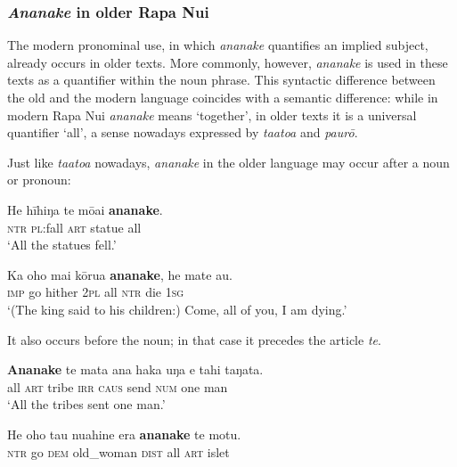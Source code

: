 \subsubsection{\textit{Ananake} in older Rapa Nui}\label{sec:4.4.4.2}

The modern pronominal use, in which \textit{ananake} quantifies an implied subject, already occurs in older texts. More commonly, however, \textit{ananake} is used in these texts as a quantifier within the noun phrase. This syntactic difference between the old and the modern language coincides with a semantic difference: while in modern Rapa Nui \textit{ananake} means ‘together’, in older texts it is a universal quantifier ‘all’, a sense nowadays expressed by \textit{ta{\ꞌ}ato{\ꞌ}a} and \textit{paurō}.

Just like \textit{ta{\ꞌ}ato{\ꞌ}a} nowadays, \textit{ananake} in the older language may occur after a noun or pronoun:

\ea\label{ex:4.66}
\gll He hīhiŋa te mōai \textbf{ananake}. \\
\textsc{ntr} \textsc{pl}:fall \textsc{art} statue all \\

\glt 
‘All the statues fell.’ \textstyleExampleref{[Mtx-4-05.060]}
\z

\ea\label{ex:4.67}
\gll Ka oho mai kōrua \textbf{ananake}, he mate au. \\
\textsc{imp} go hither \textsc{2pl} all \textsc{ntr} die \textsc{1sg} \\

\glt
‘(The king said to his children:) Come, all of you, I am dying.’ \textstyleExampleref{[Ley-2-08.009]}
\z

It also occurs before the noun; in that case it precedes the article \textit{te}. 

\ea\label{ex:4.68}
\gll \textbf{Ananake} te mata ana haka uŋa e tahi taŋata. \\
all \textsc{art} tribe \textsc{irr} \textsc{caus} send \textsc{num} one man \\

\glt 
‘All the tribes sent one man.’ \textstyleExampleref{[Ley-5-36.001]}
\z

\ea\label{ex:4.69}
\gll He oho tau nuahine era \textbf{ananake} te motu. \\
\textsc{ntr} go \textsc{dem} old\_woman \textsc{dist} all \textsc{art} islet \\

